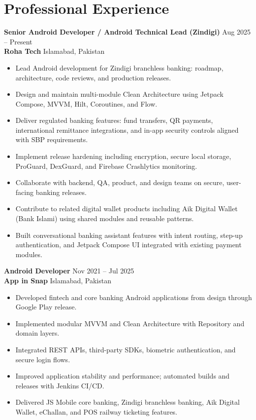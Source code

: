 \documentclass[11pt,letterpaper]{article}
\begin{document}
\section*{Professional Experience}

\textbf{Senior Android Developer / Android Technical Lead (Zindigi)} \hfill Aug 2025 -- Present\\
\textbf{Roha Tech} \hfill Islamabad, Pakistan
\begin{itemize}
  \item Lead Android development for Zindigi branchless banking: roadmap, architecture, code reviews, and production releases.
  \item Design and maintain multi-module Clean Architecture using Jetpack Compose, MVVM, Hilt, Coroutines, and Flow.
  \item Deliver regulated banking features: fund transfers, QR payments, international remittance integrations, and in-app security controls aligned with SBP requirements.
  \item Implement release hardening including encryption, secure local storage, ProGuard, DexGuard, and Firebase Crashlytics monitoring.
  \item Collaborate with backend, QA, product, and design teams on secure, user-facing banking releases.
  \item Contribute to related digital wallet products including Aik Digital Wallet (Bank Islami) using shared modules and reusable patterns.
  \item Built conversational banking assistant features with intent routing, step-up authentication, and Jetpack Compose UI integrated with existing payment modules.
\end{itemize}

\textbf{Android Developer} \hfill Nov 2021 -- Jul 2025\\
\textbf{App in Snap} \hfill Islamabad, Pakistan
\begin{itemize}
  \item Developed fintech and core banking Android applications from design through Google Play release.
  \item Implemented modular MVVM and Clean Architecture with Repository and domain layers.
  \item Integrated REST APIs, third-party SDKs, biometric authentication, and secure login flows.
  \item Improved application stability and performance; automated builds and releases with Jenkins CI/CD.
  \item Delivered JS Mobile core banking, Zindigi branchless banking, Aik Digital Wallet, eChallan, and POS railway ticketing features.
\end{itemize}
\end{document}
